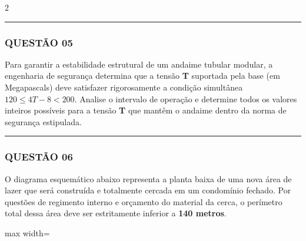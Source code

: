 \documentclass[11pt, a4paper]{article}
\begin{document}
\begin{multicols*}{2}
\vspace{0cm} \noindent\textcolor{CorLinha}{\rule{\linewidth}{0.5pt}} \vspace{-0.2cm}
\subsubsection*{QUESTÃO 05}
Para garantir a estabilidade estrutural de um andaime tubular modular, a engenharia de segurança determina que a tensão \textbf{T} suportada pela base (em Megapascals) deve satisfazer rigorosamente a condição simultânea $ 120 \le 4T - 8 < 200 $. Analise o intervalo de operação e determine todos os valores inteiros possíveis para a tensão \textbf{T} que mantêm o andaime dentro da norma de segurança estipulada.

\vspace{0cm} \noindent\textcolor{CorLinha}{\rule{\linewidth}{0.5pt}} \vspace{-0.2cm}
\subsubsection*{QUESTÃO 06}
O diagrama esquemático abaixo representa a planta baixa de uma nova área de lazer que será construída e totalmente cercada em um condomínio fechado. Por questões de regimento interno e orçamento do material da cerca, o perímetro total dessa área deve ser estritamente inferior a \textbf{140 metros}.

\begin{center}
\begin{adjustbox}{max width=\linewidth}
\end{adjustbox}
\end{center}
\end{multicols*}
\end{document}
